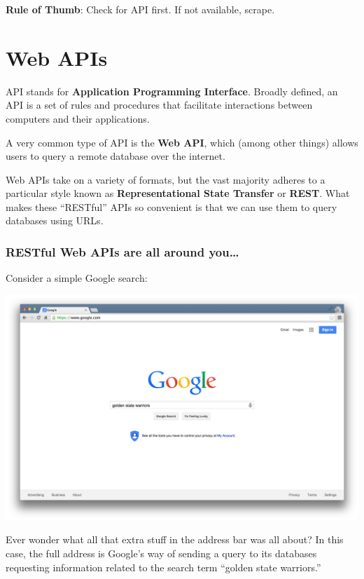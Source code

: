 \documentclass[
]{book}
\begin{document}
\textbf{Rule of Thumb}: Check for API first. If not available, scrape.

\hypertarget{web-apis}{%
\section{Web APIs}\label{web-apis}}

API stands for \textbf{Application Programming Interface}. Broadly defined, an API is a set of rules and procedures that facilitate interactions between computers and their applications.

A very common type of API is the \textbf{Web API}, which (among other things) allows users to query a remote database over the internet.

Web APIs take on a variety of formats, but the vast majority adheres to a particular style known as \textbf{Representational State Transfer} or \textbf{REST}. What makes these ``RESTful'' APIs so convenient is that we can use them to query databases using URLs.

\hypertarget{restful-web-apis-are-all-around-you}{%
\subsubsection*{RESTful Web APIs are all around you\ldots{}}\label{restful-web-apis-are-all-around-you}}

Consider a simple Google search:

\begin{center}\includegraphics[width=0.7\linewidth]{img/google_search} \end{center}

Ever wonder what all that extra stuff in the address bar was all about? In this case, the full address is Google's way of sending a query to its databases requesting information related to the search term ``golden state warriors.''
\end{document}
